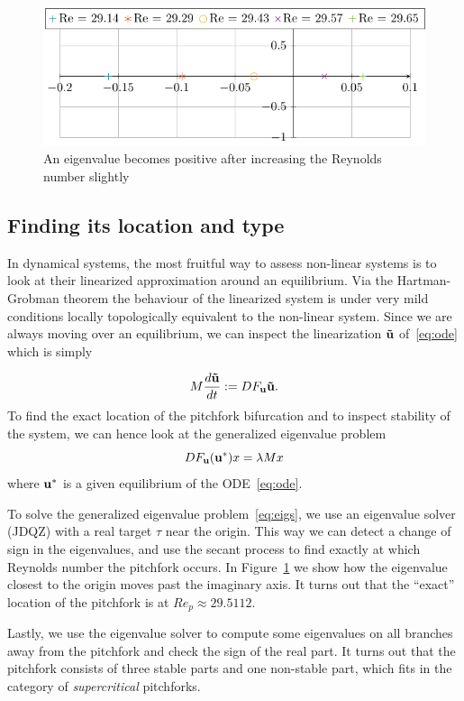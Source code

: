 \begin{figure}[p]
    \includegraphics[width=\textwidth]{images/eigenvalues.pdf}
    \caption{An eigenvalue becomes positive after increasing the Reynolds number slightly}
    \label{fig:eigenvaluespitch}
\end{figure}

\newpage

\subsection{Finding its location and type}
In dynamical systems, the most fruitful way to assess non-linear systems is to look at their linearized approximation around an equilibrium. Via the Hartman-Grobman theorem the behaviour of the linearized system is under very mild conditions locally topologically equivalent to the non-linear system. Since we are always moving over an equilibrium, we can inspect the linearization $\mathbf{\tilde u}$ of~\eqref{eq:ode} which is simply

\begin{equation}
    M\frac{d \mathbf{\tilde u} }{d t} := DF_{\mathbf{u}}\mathbf{\tilde{u}}.
\end{equation}
To find the exact location of the pitchfork bifurcation and to inspect stability of the system, we can hence look at the generalized eigenvalue problem
\begin{equation}\label{eq:eigs}
    DF_{\mathbf{u}}(\mathbf{u}^*)x = \lambda M x
\end{equation}
where $\mathbf{u}^*$ is a given equilibrium of the ODE~\eqref{eq:ode}.

To solve the generalized eigenvalue problem~\eqref{eq:eigs}, we use an eigenvalue solver (JDQZ) with a real target $\tau$ near the origin. This way we can detect a change of sign in the eigenvalues, and use the secant process to find exactly at which Reynolds number the pitchfork occurs. In Figure~\ref{fig:eigenvaluespitch} we show how the eigenvalue closest to the origin moves past the imaginary axis. It turns out that the ``exact'' location of the pitchfork is at $Re_p \approx 29.5112$.

Lastly, we use the eigenvalue solver to compute some eigenvalues on all branches away from the pitchfork and check the sign of the real part. It turns out that the pitchfork consists of three stable parts and one non-stable part, which fits in the category of {\em supercritical} pitchforks. 


